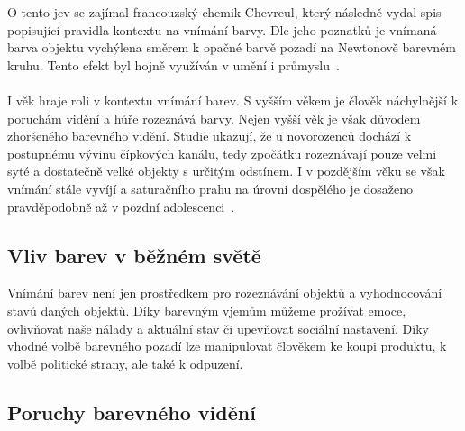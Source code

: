 O tento jev se zajímal francouzský chemik Chevreul, který následně vydal spis popisující pravidla kontextu na vnímání barvy.
Dle jeho poznatků je vnímaná barva objektu vychýlena směrem k opačné barvě pozadí na Newtonově barevném kruhu. Tento efekt byl hojně
využíván v umění i průmyslu~\cite{BEAULOTTO2002609}.
\\
\\
I věk hraje roli v kontextu vnímání barev. S vyšším věkem je člověk náchylnější k poruchám vidění a hůře rozeznává barvy. Nejen vyšší věk
je však důvodem zhoršeného barevného vidění. Studie ukazují, že u novorozenců dochází k postupnému vývinu čípkových kanálu, tedy zpočátku
rozeznávají pouze velmi syté a dostatečně velké objekty s určitým odstínem. I v pozdějším věku se však vnímání stále vyvíjí a saturačního prahu
na úrovni dospělého je dosaženo pravděpodobně až v pozdní adolescenci~\cite{infant-perception}.


\subsection{Vliv barev v běžném světě}
Vnímání barev není jen prostředkem pro rozeznávání objektů a vyhodnocování stavů daných objektů. Díky barevným vjemům můžeme
prožívat emoce, ovlivňovat naše nálady a aktuální stav či upevňovat sociální nastavení. Díky vhodné volbě barevného pozadí lze
manipulovat člověkem ke koupi produktu, k volbě politické strany, ale také k odpuzení.



\subsection{Poruchy barevného vidění}


